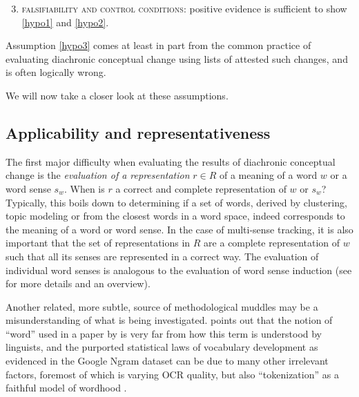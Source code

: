 \documentclass[output=paper]{langsci/langscibook}
\begin{document}
\begin{enumerate}
    \setcounter{enumi}{2}
    \item \textsc{falsifiability and control conditions:} positive evidence is sufficient to show \ref{hypo1} and \ref{hypo2}.\label{hypo3}
\end{enumerate}

Assumption \ref{hypo3} comes at least in part from the common practice of evaluating diachronic conceptual change using lists of attested such changes, and is often logically wrong.

We will now take a closer look at these assumptions.

\subsection{Applicability and representativeness}\largerpage[2]
The first major difficulty when evaluating the results of diachronic conceptual change is the \emph{evaluation of a representation} $r \in R$ of a meaning of a word $w$ or a word sense $s_w$. When is $r$ a correct and complete representation of $w$ or $s_w$? Typically, this boils down to determining if a set of words, derived by clustering, topic modeling or from the closest words in a word space, indeed corresponds to the meaning of a word or word sense. In the case of multi-sense tracking, it is also important that the set of representations in $R$ are a complete representation of $w$ such that all its senses are represented in a correct way. The evaluation of individual word senses is analogous to the evaluation of word sense induction (see \citealp{agirre:semeval,navigli2012quick} for more details and an overview).  


Another related, more subtle, source of methodological muddles may be a misunderstanding of
what is being investigated. \citet{liberman-2013} points out that the
notion of ``word'' used in a paper by \citet{petersen-etal-2012} is
very far from how this term is understood by linguists, and the
purported statistical laws of vocabulary development as evidenced in
the Google Ngram dataset can be due to many other irrelevant factors,
foremost of which is varying OCR quality, but also ``tokenization'' as a faithful model of wordhood \citep{dridan-oepen-2012}.
\end{document}
